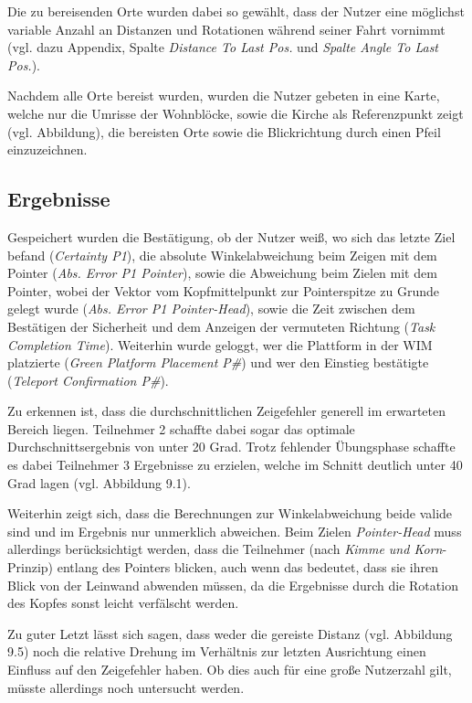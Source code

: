 Die zu bereisenden Orte wurden dabei so gewählt, dass der Nutzer eine möglichst variable Anzahl an Distanzen und Rotationen während seiner Fahrt vornimmt (vgl. dazu Appendix, Spalte \textit{Distance To Last Pos.} und \textit{Spalte Angle To Last Pos.}).

Nachdem alle Orte bereist wurden, wurden die Nutzer gebeten in eine Karte, welche nur die Umrisse der Wohnblöcke, sowie die Kirche als Referenzpunkt zeigt (vgl. Abbildung), die bereisten Orte sowie die Blickrichtung durch einen Pfeil einzuzeichnen.


\subsection{Ergebnisse}

Gespeichert wurden die Bestätigung, ob der Nutzer weiß, wo sich das letzte Ziel befand (\textit{Certainty P1}), die absolute Winkelabweichung beim Zeigen mit dem Pointer (\textit{Abs. Error P1 Pointer}), sowie die Abweichung beim Zielen mit dem Pointer, wobei der Vektor vom Kopfmittelpunkt zur Pointerspitze zu Grunde gelegt wurde (\textit{Abs. Error P1 Pointer-Head}), sowie die Zeit zwischen dem Bestätigen der Sicherheit und dem Anzeigen der vermuteten Richtung (\textit{Task Completion Time}). Weiterhin wurde geloggt, wer die Plattform in der WIM platzierte (\textit{Green Platform Placement P\#}) und wer den Einstieg bestätigte (\textit{Teleport Confirmation P\#}).

Zu erkennen ist, dass die durchschnittlichen Zeigefehler generell im erwarteten Bereich liegen. Teilnehmer 2 schaffte dabei sogar das optimale Durchschnittsergebnis von unter 20 Grad. Trotz fehlender Übungsphase schaffte es dabei Teilnehmer 3 Ergebnisse zu erzielen, welche im Schnitt deutlich unter 40 Grad lagen (vgl. Abbildung 9.1).

Weiterhin zeigt sich, dass die Berechnungen zur Winkelabweichung beide valide sind und im Ergebnis nur unmerklich abweichen. Beim Zielen \textit{Pointer-Head} muss allerdings berücksichtigt werden, dass die Teilnehmer (nach \textit{Kimme und Korn}-Prinzip) entlang des Pointers blicken, auch wenn das bedeutet, dass sie ihren Blick von der Leinwand abwenden müssen, da die Ergebnisse durch die Rotation des Kopfes sonst leicht verfälscht werden.

Zu guter Letzt lässt sich sagen, dass weder die gereiste Distanz (vgl. Abbildung 9.5) noch die relative Drehung im Verhältnis zur letzten Ausrichtung einen Einfluss auf den Zeigefehler haben. Ob dies auch für eine große Nutzerzahl gilt, müsste allerdings noch untersucht werden.


